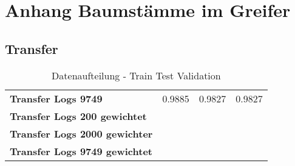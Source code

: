 \chapter{Anhang Baumstämme im Greifer}
\label{appendix:BaumstammImGreifer}


	\section{Transfer}
	\label{appendix:Transfer}



	\begin{table}[ht]
	\centering
	\begin{tabularx}{\textwidth}{llll}
		\textbf{Transfer Logs 9749} 				 & 	0.9885			& 0.9827	 & 0.9827	\\ \rowcolor{Gray}
		\textbf{Transfer Logs 200 gewichtet}	 	  &  	   &  	\\		
		\textbf{Transfer Logs 2000 gewichter}	 	  &  	   &  	\\	
		\textbf{Transfer Logs 9749 gewichtet}	 	  &  	   &  	\\	
	\end{tabularx}
	\caption{Datenaufteilung - Train Test Validation}
	\label{table:DatenaufteilungTrainTestValidation}
\end{table}